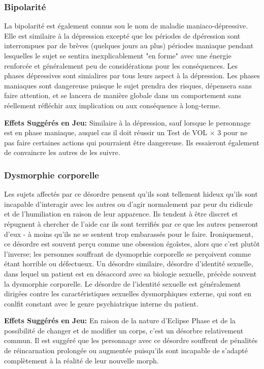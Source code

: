 \subsubsection{Bipolarité} 

La bipolarité est également connus sou le nom de maladie maniaco-dépressive. Elle est similaire à la dépression excepté que les périodes de dpéression sont interrompues par de brèves (quelques jours au plus) périodes maniaque pendant lesquelles le sujet se sentira inexplicablement "en forme" avec une énergie renforcée et généralement peu de considérations pour les conséquences. Les phases dépressives sont simialires par tous leurs aspect à la dépression. Les phases maniaques sont dangereuse puisque le sujet prendra des risques, dépensera sans faire attention, et se lancera de manière globale dans un comportement sans réellement réfléchir aux implication ou aux conséquence à long-terme. 

\textbf{Effets Suggérés en Jeu:} Similaire à la dépression, sauf lorsque le personnage est en phase maniaque, auquel cas il doit réussir un Test de VOL $\times$ 3 pour ne pas faire certaines actions qui pourraient être dangereuse. Ils essaieront également de convaincre les autres de les suivre. 

\subsubsection{Dysmorphie corporelle} 

Les sujets affectés par ce désordre pensent qu'ils sont tellement hideux qu'ils sont incapable d'interagir avec les autres ou d'agir normalement par peur du ridicule et de l'humiliation en raison de leur apparence. Ils tendent à être discret et répugnent à chercher de l'aide car ils sont terrifiés par ce que les autres penseront d'eux - à moins qu'ils ne se sentent trop embarassés pour le faire. Ironiquement, ce désordre est souvent perçu comme une obsession égoîstes, alors que c'est plutôt l'inverse; les personnes souffrant de dysmoprhie corporelle se perçoivent comme étant horrible ou défectueux. Un désordre similaire, désordre d'identité sexuelle, dans lequel un patient est en désaccord avec sa biologie sexuelle, précède souvent la dysmorphie corporelle. Le désordre de l'identité sexuelle est généralement dirigées contre les caractéristiques sexuelles dysmorphiques externe, qui sont en conlfit constant avec le genre psychiatrique interne du patient. 

\textbf{Effets Suggérés en Jeu:} En raison de la nature d'Eclipse Phase et de la possibilité de changer et de modifier un corps, c'est un désorbre relativement commun. Il est suggéré que les personnage avec ce désordre souffrent de pénalités de réincarnation prolongée ou augmentée puisqu'ils sont incapable de s'adapté complètement à la réalité de leur nouvelle morph. 

